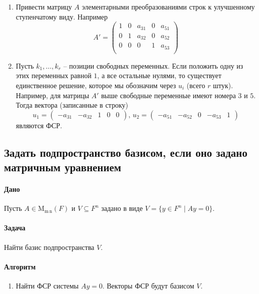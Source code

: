 \documentclass{article}
\newcommand{\MatrixDim}[3]{\operatorname{\mathrm{M}_{#2\,#3}}(#1)}
\begin{document}
\begin{enumerate}
\item Привести матрицу $A$ элементарными преобразованиями строк к улучшенному ступенчатому виду.
Например
\[
A' = 
\begin{pmatrix}
{1}&{0}&{a_{31}}&{0}&{a_{51}}\\
{0}&{1}&{a_{32}}&{0}&{a_{52}}\\
{0}&{0}&{0}&{1}&{a_{53}}\\
\end{pmatrix}
\]

\item Пусть $k_1,\ldots,k_r$ -- позиции свободных переменных.
Если положить одну из этих переменных равной $1$, а все остальные нулями, то существует единственное решение, которое мы обозначим через $u_i$ (всего $r$ штук).
Например, для матрицы $A'$ выше свободные переменные имеют номера $3$ и $5$.
Тогда вектора (записанные в строку)
\[
u_1 = 
\begin{pmatrix}
{-a_{31}}&{-a_{32}}&{1}&{0}&{0}
\end{pmatrix},\,
u_2 = 
\begin{pmatrix}
{-a_{51}}&{-a_{52}}&{0}&{-a_{53}}&{1}
\end{pmatrix}
\]
являются ФСР.
\end{enumerate}

\subsection{Задать подпространство базисом, если оно задано матричным уравнением}

\paragraph{Дано}

Пусть $A\in\MatrixDim{F}{m}{n}$ и $V\subseteq F^{n}$ задано в виде $V = \{y\in F^{n}\mid A y = 0\}$.

\paragraph{Задача}

Найти базис подпространства $V$.

\paragraph{Алгоритм}

\begin{enumerate}
\item Найти ФСР системы $Ay = 0$.
Векторы ФСР будут базисом $V$.
\end{enumerate}
\end{document}

